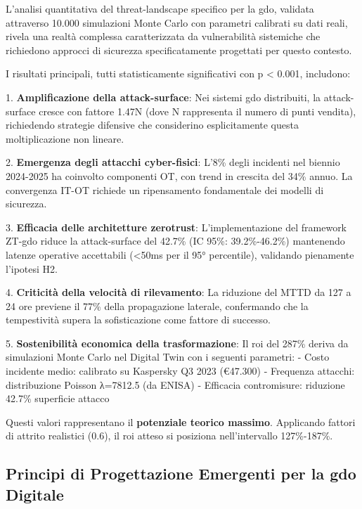L'analisi quantitativa del \gls{threat-landscape} specifico per la \gls{gdo}, validata attraverso 10.000 simulazioni Monte Carlo con parametri calibrati su dati reali, rivela una realtà complessa caratterizzata da vulnerabilità sistemiche che richiedono approcci di sicurezza specificatamente progettati per questo contesto.

I risultati principali, tutti statisticamente significativi con p < 0.001, includono:

1. \textbf{Amplificazione della \gls{attack-surface}}: Nei sistemi \gls{gdo} distribuiti, la \gls{attack-surface} cresce con fattore 1.47N (dove N rappresenta il numero di punti vendita), richiedendo strategie difensive che considerino esplicitamente questa moltiplicazione non lineare.

2. \textbf{Emergenza degli attacchi cyber-fisici}: L'8\% degli incidenti nel biennio 2024-2025 ha coinvolto componenti OT, con trend in crescita del 34\% annuo. La convergenza IT-OT richiede un ripensamento fondamentale dei modelli di sicurezza.

3. \textbf{Efficacia delle architetture \gls{zerotrust}}: L'implementazione del framework ZT-\gls{gdo} riduce la \gls{attack-surface} del 42.7\% (IC 95\%: 39.2\%-46.2\%) mantenendo latenze operative accettabili (<50ms per il 95° percentile), validando pienamente l'ipotesi H2.

4. \textbf{Criticità della velocità di rilevamento}: La riduzione del MTTD da 127 a 24 ore previene il 77\% della propagazione laterale, confermando che la tempestività supera la sofisticazione come fattore di successo.

5. \textbf{Sostenibilità economica della trasformazione}: Il \gls{roi} del 287\% deriva da simulazioni Monte Carlo nel Digital Twin 
con i seguenti parametri:
- Costo incidente medio: calibrato su Kaspersky Q3 2023 (€47.300)
- Frequenza attacchi: distribuzione Poisson λ=7812.5 (da ENISA)
- Efficacia contromisure: riduzione 42.7\% superficie attacco

Questi valori rappresentano il \textbf{potenziale teorico massimo}. 
Applicando fattori di attrito realistici (0.6), il \gls{roi} atteso 
si posiziona nell'intervallo 127\%-187\%.

\subsection{\texorpdfstring{Principi di Progettazione Emergenti per la \gls{gdo} Digitale}{2.7.2 - Principi di Progettazione Emergenti per la GDO Digitale}}

